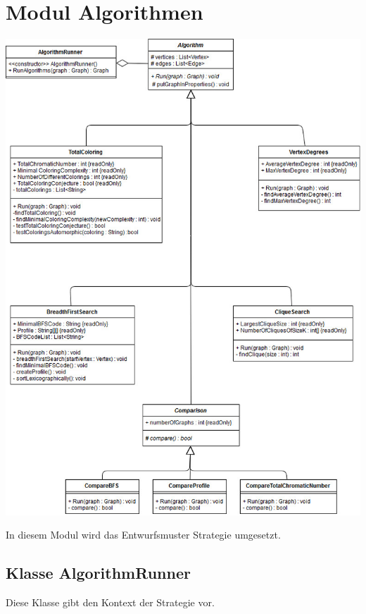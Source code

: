 \documentclass[13pt]{scrreprt}
\begin{document}
	\section{Modul Algorithmen}
	\includegraphics[scale=0.50,center]{Algorithms.jpg}
	
	In diesem Modul wird das Entwurfsmuster Strategie umgesetzt. 
	
	\subsection{Klasse AlgorithmRunner}
	
	Diese Klasse gibt den Kontext der Strategie vor.
	
\end{document}
